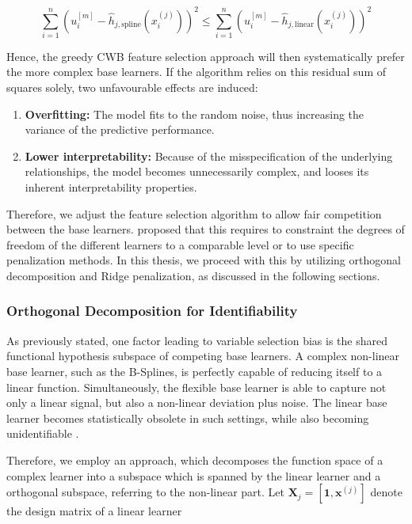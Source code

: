 \documentclass[fontsize=12 pt]{scrartcl}
\begin{document}
\begin{equation}
    \sum_{i=1}^n \left( u_i^{[m]} - \hat{h}_{j, \text{spline}}(x_i^{(j)}) \right)^2 \leq \sum_{i=1}^n \left( u_i^{[m]} - \hat{h}_{j, \text{linear}}(x_i^{(j)}) \right)^2
\end{equation}

Hence, the greedy CWB feature selection approach will then systematically prefer the more complex base learners. If the algorithm relies on this residual sum of squares solely, two unfavourable effects are induced:

\begin{enumerate}
    \item \textbf{Overfitting:} The model fits to the random noise, thus increasing the variance of the predictive performance. 
    \item \textbf{Lower interpretability:} Because of the misspecification of the underlying relationships, the model becomes unnecessarily complex, and looses its inherent interpretability properties.
\end{enumerate}

Therefore, we adjust the feature selection algorithm to allow fair competition between the base learners. \citet{hofner2011selection} proposed that this requires to constraint the degrees of freedom of the different learners to a comparable level or to use specific penalization methods. In this thesis, we proceed with this by utilizing orthogonal decomposition and Ridge penalization, as discussed in the following sections.

\subsubsection{Orthogonal Decomposition for Identifiability}
\label{sec:orth_decomp}

As previously stated, one factor leading to variable selection bias is the shared functional hypothesis subspace of competing base learners. A complex non-linear base learner, such as the B-Splines, is perfectly capable of reducing itself to a linear function. Simultaneously, the flexible base learner is able to capture not only a linear signal, but also a non-linear deviation plus noise. The linear base learner becomes statistically obsolete in such settings, while also becoming unidentifiable \citep{hofner2011selection}.

Therefore, we employ an approach, which decomposes the function space of a complex learner into a subspace which is spanned by the linear learner and a orthogonal subspace, referring to the non-linear part. Let $\mathbf{X}_j = [\mathbf{1}, \mathbf{x}^{(j)}]$ denote the design matrix of a linear learner
\end{document}
